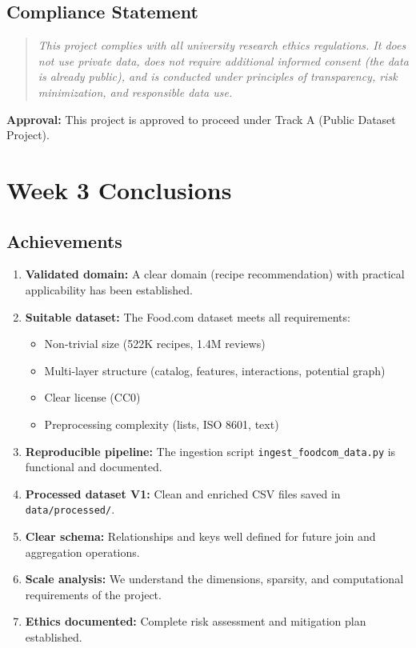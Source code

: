 \documentclass[11pt,a4paper]{article}
\begin{document}
\subsection{Compliance Statement}

\begin{quote}
\textit{This project complies with all university research ethics regulations. It does not use private data, does not require additional informed consent (the data is already public), and is conducted under principles of transparency, risk minimization, and responsible data use.}
\end{quote}

\textbf{Approval:} This project is approved to proceed under Track A (Public Dataset Project).

\section{Week 3 Conclusions}

\subsection{Achievements}

\begin{enumerate}
    \item \textbf{Validated domain:} A clear domain (recipe recommendation) with practical applicability has been established.

    \item \textbf{Suitable dataset:} The Food.com dataset meets all requirements:
    \begin{itemize}
        \item Non-trivial size (522K recipes, 1.4M reviews)
        \item Multi-layer structure (catalog, features, interactions, potential graph)
        \item Clear license (CC0)
        \item Preprocessing complexity (lists, ISO 8601, text)
    \end{itemize}

    \item \textbf{Reproducible pipeline:} The ingestion script \texttt{ingest\_foodcom\_data.py} is functional and documented.

    \item \textbf{Processed dataset V1:} Clean and enriched CSV files saved in \texttt{data/processed/}.

    \item \textbf{Clear schema:} Relationships and keys well defined for future join and aggregation operations.

    \item \textbf{Scale analysis:} We understand the dimensions, sparsity, and computational requirements of the project.

    \item \textbf{Ethics documented:} Complete risk assessment and mitigation plan established.
\end{enumerate}
\end{document}
